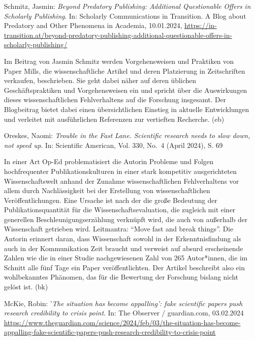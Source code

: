 \documentclass[a4paper,
fontsize=11pt,
oneside,
numbers=noperiodatend,
parskip=half-,
bibliography=totoc,
final
]{scrartcl}
\begin{document}
Schmitz, Jasmin: \emph{Beyond Predatory Publishing: Additional
Questionable Offers in Scholarly Publishing}. In: Scholarly
Communications in Transition. A Blog about Predatory and Other Phenomena
in Academia, 10.01.2024,
\url{https://in-transition.at/beyond-predatory-publishing-additional-questionable-offers-in-scholarly-publishing/}

Im Beitrag von Jasmin Schmitz werden Vorgehensweisen und Praktiken von
Paper Mills, die wissenschaftliche Artikel und deren Platzierung in
Zeitschriften verkaufen, beschrieben. Sie geht dabei näher auf deren
üblichen Geschäftspraktiken und Vorgehensweisen ein und spricht über die
Auswirkungen dieses wissenschaftlichen Fehlverhaltens auf die Forschung
insgesamt. Der Blogbeitrag bietet dabei einen übersichtlichen Einstieg
in aktuelle Entwicklungen und verleitet mit ausführlichen Referenzen zur
vertieften Recherche. (eb)

Oreskes, Naomi: \emph{Trouble in the Fast Lane. Scientific research
needs to slow down, not speed up}. In: Scientific American, Vol. 330,
No.~4 (April 2024), S. 69

In einer Art Op-Ed problematisiert die Autorin Probleme und Folgen
hochfrequenter Publikationskulturen in einer stark kompetitiv
ausgerichteten Wissenschaftswelt anhand der Zunahme wissenschaftlichen
Fehlverhaltens vor allem durch Nachlässigkeit bei der Erstellung von
wissenschaftlichen Veröffentlichungen. Eine Ursache ist nach der die
große Bedeutung der Publikationsquantität für die
Wissenschaftsevaluation, die zugleich mit einer generellen
Beschleunigungserzählung verknüpft wird, die auch von außerhalb der
Wissenschaft getrieben wird. Leitmantra: \enquote{Move fast and break
things}. Die Autorin erinnert daran, dass Wissenschaft sowohl in der
Erkenntnisfindung als auch in der Kommunikation Zeit braucht und
verweist auf absurd erscheinende Zahlen wie die in einer Studie
nachgewiesenen Zahl von 265 Autor*innen, die im Schnitt alle fünf Tage
ein Paper veröffentlichten. Der Artikel beschreibt also ein
wohlbekanntes Phänomen, das für die Bewertung der Forschung bislang
nicht gelöst ist. (bk)

McKie, Robin: '\emph{The situation has become appalling': fake
scientific papers push research credibility to crisis point}. In: The
Observer / guardian.com, 03.02.2024
\url{https://www.theguardian.com/science/2024/feb/03/the-situation-has-become-appalling-fake-scientific-papers-push-research-credibility-to-crisis-point}
\end{document}
